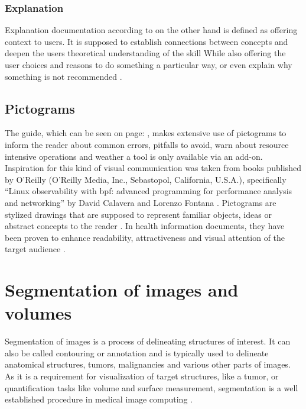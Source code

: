 \subsubsection*{Explanation}
Explanation documentation according to \citeauthor{procidaDiataxisDocumentationFramework2023} on the other hand is defined as offering context to users.
It is supposed to establish connections between concepts and deepen the users theoretical understanding of the skill
While also offering the user choices and reasons to do something a particular way, or even explain why something is not recommended \cite{procidaPythonDocsCommunity2022,procidaDiataxisDocumentationFramework2023}.


\subsection{Pictograms}\label{s:b-pictograms}
The guide, which can be seen on page: \pageref{a:guide}, makes extensive use of pictograms to inform the reader about common errors, pitfalls to avoid, warn about resource intensive operations and weather a tool is only available via an add-on.
Inspiration for this kind of visual communication was taken from books published by O'Reilly (O'Reilly Media, Inc., Sebastopol, California, U.S.A.), specifically ``Linux observability with \acrshort{bpf}: advanced programming for performance analysis and networking'' by David Calavera and Lorenzo Fontana \cite{calaveraLinuxObservabilityBPF2019}.
Pictograms are stylized drawings that are supposed to represent familiar objects, ideas or abstract concepts to the reader \cite{dowsePharmacistsAreWords2021}.
In health information documents, they have been proven to enhance readability, attractiveness and visual attention of the target audience \cite{houtsRolePicturesImproving2006,mansoorEffectPictogramsReadability2003}.\\


\pagebreak
\section{Segmentation of images and volumes}\label{s:b-segmentation-basics}
Segmentation of images is a process of delineating structures of interest.
It can also be called contouring or annotation and is typically used to delineate anatomical structures, tumors,
malignancies and various other parts of images.
As it is a requirement for visualization of target structures, like a tumor, or quantification tasks like volume and surface measurement,
segmentation is a well established procedure in medical image computing \cite{pinterPolymorphSegmentationRepresentation2019,slicercommunity3DSlicerImage2022}.

